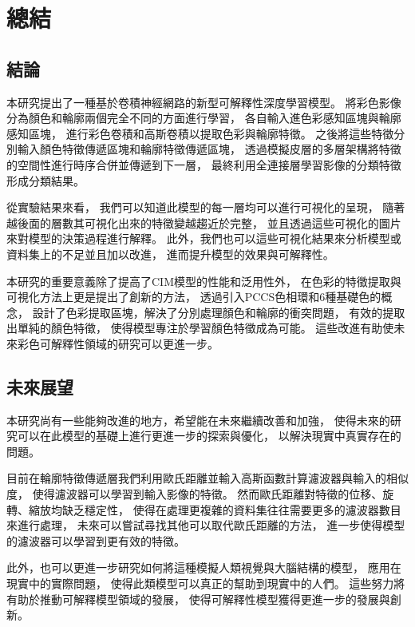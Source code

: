 \documentclass[class=NCU_thesis, crop=false]{standalone}
\begin{document}
\chapter{總結}
\section{結論}

本研究提出了一種基於卷積神經網路的新型可解釋性深度學習模型。
將彩色影像分為顏色和輪廓兩個完全不同的方面進行學習，
各自輸入進色彩感知區塊與輪廓感知區塊，
進行彩色卷積和高斯卷積以提取色彩與輪廓特徵。
之後將這些特徵分別輸入顏色特徵傳遞區塊和輪廓特徵傳遞區塊，
透過模擬皮層的多層架構將特徵的空間性進行時序合併並傳遞到下一層，
最終利用全連接層學習影像的分類特徵形成分類結果。

從實驗結果來看，
我們可以知道此模型的每一層均可以進行可視化的呈現，
隨著越後面的層數其可視化出來的特徵變越趨近於完整，
並且透過這些可視化的圖片來對模型的決策過程進行解釋。
此外，我們也可以這些可視化結果來分析模型或資料集上的不足並且加以改進，
進而提升模型的效果與可解釋性。

本研究的重要意義除了提高了CIM模型的性能和泛用性外，
在色彩的特徵提取與可視化方法上更是提出了創新的方法，
透過引入PCCS色相環和6種基礎色的概念，
設計了色彩提取區塊，解決了分別處理顏色和輪廓的衝突問題，
有效的提取出單純的顏色特徵，
使得模型專注於學習顏色特徵成為可能。
這些改進有助使未來彩色可解釋性領域的研究可以更進一步。

\section{未來展望}
本研究尚有一些能夠改進的地方，希望能在未來繼續改善和加強，
使得未來的研究可以在此模型的基礎上進行更進一步的探索與優化，
以解決現實中真實存在的問題。

目前在輪廓特徵傳遞層我們利用歐氏距離並輸入高斯函數計算濾波器與輸入的相似度，
使得濾波器可以學習到輸入影像的特徵。
然而歐氏距離對特徵的位移、旋轉、縮放均缺乏穩定性，
使得在處理更複雜的資料集往往需要更多的濾波器數目來進行處理，
未來可以嘗試尋找其他可以取代歐氏距離的方法，
進一步使得模型的濾波器可以學習到更有效的特徵。

此外，也可以更進一步研究如何將這種模擬人類視覺與大腦結構的模型，
應用在現實中的實際問題，
使得此類模型可以真正的幫助到現實中的人們。
這些努力將有助於推動可解釋模型領域的發展，
使得可解釋性模型獲得更進一步的發展與創新。
\end{document}
